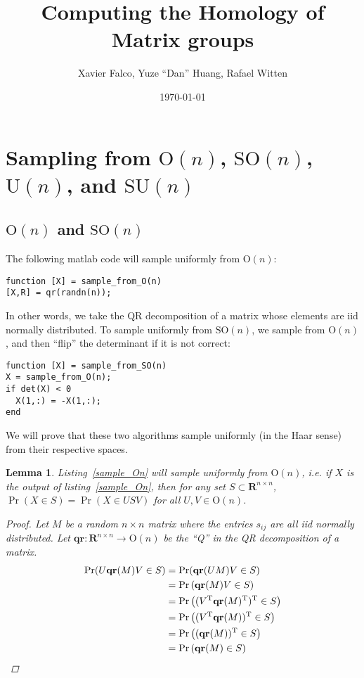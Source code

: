 \documentclass[letterpaper,11pt]{article}
\title{Computing the Homology of Matrix groups}
\author{Xavier Falco, Yuze ``Dan'' Huang, Rafael Witten}
\date{\today}
\newtheorem{lemma}{Lemma}
\newcommand{\Tr}{^\text{T}}
\newcommand{\reals}{\mathbf{R}}
\newcommand{\MG}[2]{\text{#1}(#2)}
\newcommand{\Un}{\MG{U}{n}}
\newcommand{\On}{\MG{O}{n}}
\newcommand{\SUn}{\MG{SU}{n}}
\newcommand{\SOn}{\MG{SO}{n}}
\newcommand{\qr}{\mathbf{qr}}
\begin{document}
\maketitle
\thispagestyle{empty}
\tableofcontents
\thispagestyle{empty}
\section{Sampling from $\On$, $\SOn$, $\Un$, and $\SUn$}

\subsection{$\On$ and $\SOn$}
The following matlab code will sample uniformly from $\On$:

\begin{lstlisting}[label=sample_On,caption=Sampling from $\On$]
function [X] = sample_from_O(n)
[X,R] = qr(randn(n));
\end{lstlisting}

In other words, we take the QR decomposition of a matrix whose elements are iid
  normally distributed.
To sample uniformly from $\SOn$, we sample from $\On$, and then
  ``flip'' the determinant if it is not correct:

\begin{lstlisting}[label=sample_SOn,caption=Sampling from $\SOn$]
function [X] = sample_from_SO(n)
X = sample_from_O(n);
if det(X) < 0
  X(1,:) = -X(1,:);
end
\end{lstlisting}

We will prove that these two algorithms sample uniformly (in the Haar sense)
  from their respective spaces.

\begin{lemma}
Listing~\ref{sample_On} will sample uniformly from $\On$, i.e. if $X$
  is the output of listing~\ref{sample_On}, then for any set $S\subset
  \reals^{n\times n}$, $\Pr(X\in S) = \Pr(X\in USV)$ for all $U,V \in \On$.

\begin{proof}
Let $M$ be a random $n\times n$ matrix where the entries $s_{ij}$ are all iid
  normally distributed.
Let $\qr:\reals^{n\times n} \to \On$ be the ``Q'' in the QR decomposition
  of a matrix.
\begin{align}
\Pr(U\qr(M)V\in S) &= \Pr(\qr(UM)V \in S)\\
  &= \Pr\left(\qr(M)V \in S             \right)\\
  &= \Pr\left( (V\Tr\qr(M)\Tr)\Tr \in S \right)\\
  &= \Pr\left( (V\Tr\qr(M))\Tr \in S    \right)\\
  &= \Pr\left((\qr(M))\Tr \in S         \right)\\
  &= \Pr\left(\qr(M) \in S              \right)\qedhere
\end{align}
\end{proof}
\end{lemma}
\end{document}
